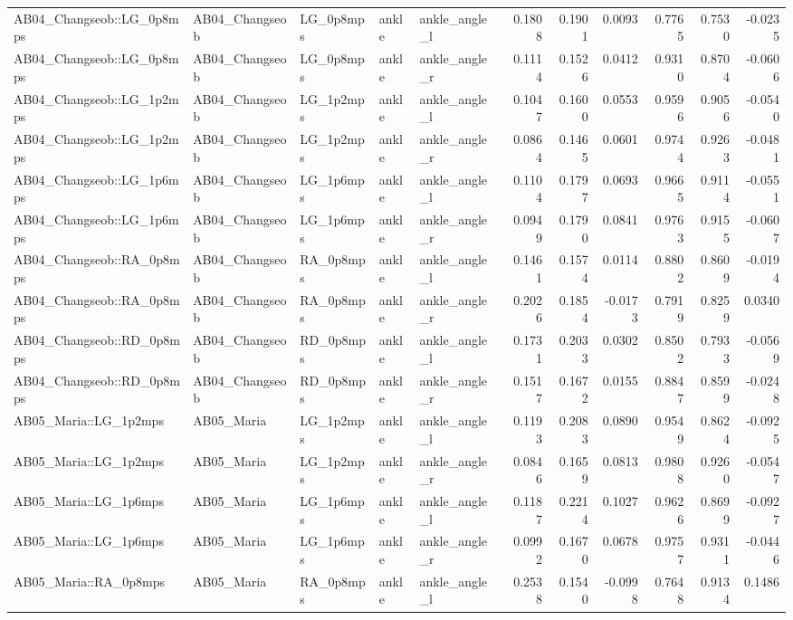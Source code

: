 \begin{table}
\begin{tabular}{lllllrrrrrr}
AB04_Changseob::LG_0p8mps & AB04_Changseob & LG_0p8mps & ankle & ankle_angle_l & 0.1808 & 0.1901 & 0.0093 & 0.7765 & 0.7530 & -0.0235 \\
AB04_Changseob::LG_0p8mps & AB04_Changseob & LG_0p8mps & ankle & ankle_angle_r & 0.1114 & 0.1526 & 0.0412 & 0.9310 & 0.8704 & -0.0606 \\
AB04_Changseob::LG_1p2mps & AB04_Changseob & LG_1p2mps & ankle & ankle_angle_l & 0.1047 & 0.1600 & 0.0553 & 0.9596 & 0.9056 & -0.0540 \\
AB04_Changseob::LG_1p2mps & AB04_Changseob & LG_1p2mps & ankle & ankle_angle_r & 0.0864 & 0.1465 & 0.0601 & 0.9744 & 0.9263 & -0.0481 \\
AB04_Changseob::LG_1p6mps & AB04_Changseob & LG_1p6mps & ankle & ankle_angle_l & 0.1104 & 0.1797 & 0.0693 & 0.9665 & 0.9114 & -0.0551 \\
AB04_Changseob::LG_1p6mps & AB04_Changseob & LG_1p6mps & ankle & ankle_angle_r & 0.0949 & 0.1790 & 0.0841 & 0.9763 & 0.9155 & -0.0607 \\
AB04_Changseob::RA_0p8mps & AB04_Changseob & RA_0p8mps & ankle & ankle_angle_l & 0.1461 & 0.1574 & 0.0114 & 0.8802 & 0.8609 & -0.0194 \\
AB04_Changseob::RA_0p8mps & AB04_Changseob & RA_0p8mps & ankle & ankle_angle_r & 0.2026 & 0.1854 & -0.0173 & 0.7919 & 0.8259 & 0.0340 \\
AB04_Changseob::RD_0p8mps & AB04_Changseob & RD_0p8mps & ankle & ankle_angle_l & 0.1731 & 0.2033 & 0.0302 & 0.8502 & 0.7933 & -0.0569 \\
AB04_Changseob::RD_0p8mps & AB04_Changseob & RD_0p8mps & ankle & ankle_angle_r & 0.1517 & 0.1672 & 0.0155 & 0.8847 & 0.8599 & -0.0248 \\
AB05_Maria::LG_1p2mps & AB05_Maria & LG_1p2mps & ankle & ankle_angle_l & 0.1193 & 0.2083 & 0.0890 & 0.9549 & 0.8624 & -0.0925 \\
AB05_Maria::LG_1p2mps & AB05_Maria & LG_1p2mps & ankle & ankle_angle_r & 0.0846 & 0.1659 & 0.0813 & 0.9808 & 0.9260 & -0.0547 \\
AB05_Maria::LG_1p6mps & AB05_Maria & LG_1p6mps & ankle & ankle_angle_l & 0.1187 & 0.2214 & 0.1027 & 0.9626 & 0.8699 & -0.0927 \\
AB05_Maria::LG_1p6mps & AB05_Maria & LG_1p6mps & ankle & ankle_angle_r & 0.0992 & 0.1670 & 0.0678 & 0.9757 & 0.9311 & -0.0446 \\
AB05_Maria::RA_0p8mps & AB05_Maria & RA_0p8mps & ankle & ankle_angle_l & 0.2538 & 0.1540 & -0.0998 & 0.7648 & 0.9134 & 0.1486 \\

\end{tabular}
\end{table}
